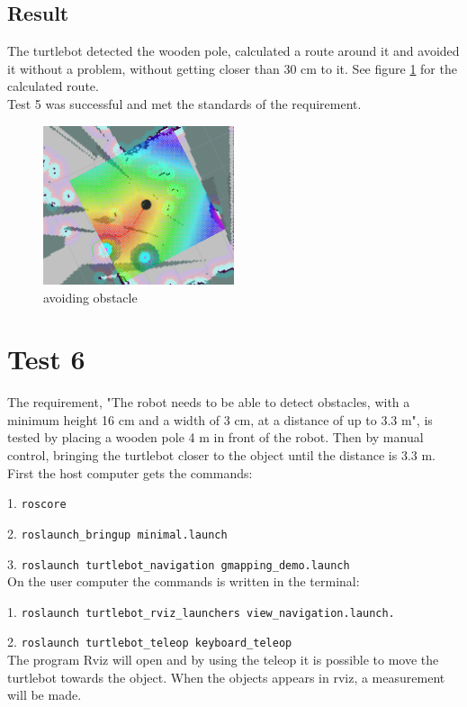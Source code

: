 \subsection{Result}
The turtlebot detected the wooden pole, calculated a route around it and avoided it without a problem, without getting closer than 30 cm to it. See figure \ref{fig:30cm} for the calculated route.\\
Test 5 was successful and met the standards of the requirement.\\
\begin{figure}[h]
    \centering
    \includegraphics[width=0.5\textwidth]{figures/30cm.png}
    \caption{avoiding obstacle} 
    \label{fig:30cm} 
\end{figure}
\newpage

%
%
%
%

\section{Test 6}
The requirement, "The robot needs to be able to detect obstacles, with a minimum height 16 cm and a width of 3 cm, at a distance of up to 3.3 m", is tested by placing a wooden pole 4 m in front of the robot. Then by manual control, bringing the turtlebot closer to the object until the distance is 3.3 m.\\ 
\newline
First the host computer gets the commands:

1. \texttt{roscore}

2. \texttt{roslaunch\_bringup minimal.launch}

3. \texttt{roslaunch turtlebot\_navigation gmapping\_demo.launch}\\
On the user computer the commands is written in the terminal:

1. \texttt{roslaunch turtlebot\_rviz\_launchers view\_navigation.launch.}

2. \texttt{roslaunch turtlebot\_teleop keyboard\_teleop}\\
The program Rviz will open and by using the teleop it is possible to move the turtlebot towards the object. When the objects appears in rviz, a measurement will be made.

